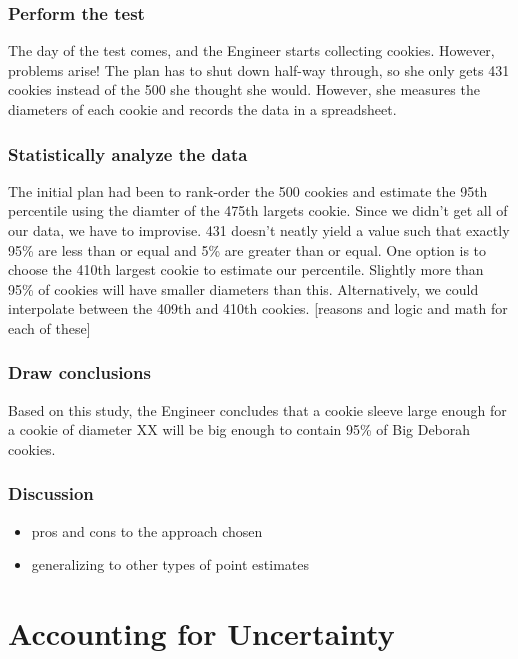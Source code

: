 \documentclass[]{book}
\providecommand{\tightlist}{%
  \setlength{\itemsep}{0pt}\setlength{\parskip}{0pt}}
\begin{document}
\subsection{Perform the test}\label{perform-the-test}

The day of the test comes, and the Engineer starts collecting cookies.
However, problems arise! The plan has to shut down half-way through, so
she only gets 431 cookies instead of the 500 she thought she would.
However, she measures the diameters of each cookie and records the data
in a spreadsheet.

\subsection{Statistically analyze the
data}\label{statistically-analyze-the-data-2}

The initial plan had been to rank-order the 500 cookies and estimate the
95th percentile using the diamter of the 475th largets cookie. Since we
didn't get all of our data, we have to improvise. 431 doesn't neatly
yield a value such that exactly 95\% are less than or equal and 5\% are
greater than or equal. One option is to choose the 410th largest cookie
to estimate our percentile. Slightly more than 95\% of cookies will have
smaller diameters than this. Alternatively, we could interpolate between
the 409th and 410th cookies. {[}reasons and logic and math for each of
these{]}

\subsection{Draw conclusions}\label{draw-conclusions-2}

Based on this study, the Engineer concludes that a cookie sleeve large
enough for a cookie of diameter XX will be big enough to contain 95\% of
Big Deborah cookies.

\subsection{Discussion}\label{discussion}

\begin{itemize}
\tightlist
\item
  pros and cons to the approach chosen
\item
  generalizing to other types of point estimates
\end{itemize}

\chapter{Accounting for Uncertainty}\label{accounting-for-uncertainty}
\end{document}
